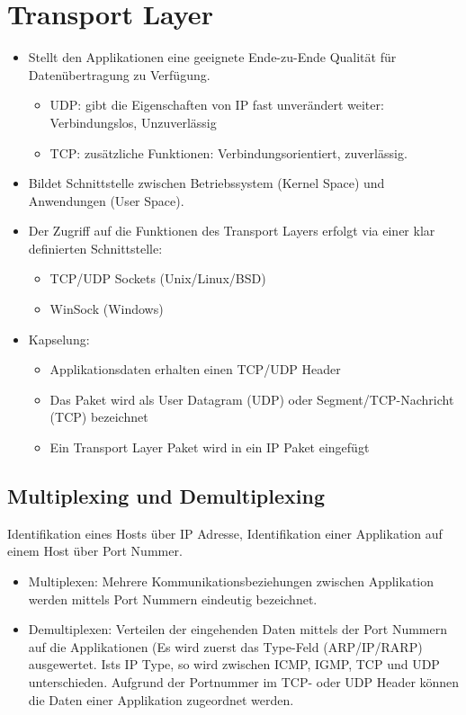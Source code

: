 \section*{Transport Layer}
\begin{itemize}
\item Stellt den Applikationen eine geeignete Ende-zu-Ende Qualität für
Datenübertragung zu Verfügung.

\begin{itemize}
\item UDP: gibt die Eigenschaften von IP fast unverändert weiter: Verbindungslos,
Unzuverlässig
\item TCP: zusätzliche Funktionen: Verbindungsorientiert, zuverlässig.
\end{itemize}
\item Bildet Schnittstelle zwischen Betriebssystem (Kernel Space) und Anwendungen
(User Space). 
\item Der Zugriff auf die Funktionen des Transport Layers erfolgt via einer
klar definierten Schnittstelle:

\begin{itemize}
\item TCP/UDP Sockets (Unix/Linux/BSD)
\item WinSock (Windows)
\end{itemize}
\item Kapselung: 

\begin{itemize}
\item Applikationsdaten erhalten einen TCP/UDP Header
\item Das Paket wird als User Datagram (UDP) oder Segment/TCP-Nachricht
(TCP) bezeichnet
\item Ein Transport Layer Paket wird in ein IP Paket eingefügt
\end{itemize}
\end{itemize}

\subsection*{Multiplexing und Demultiplexing}

Identifikation eines Hosts über IP Adresse, Identifikation einer Applikation
auf einem Host über Port Nummer.
\begin{itemize}
\item Multiplexen: Mehrere Kommunikationsbeziehungen zwischen Applikation
werden mittels Port Nummern eindeutig bezeichnet.
\item Demultiplexen: Verteilen der eingehenden Daten mittels der Port Nummern
auf die Applikationen (Es wird zuerst das Type-Feld (ARP/IP/RARP)
ausgewertet. Ists IP Type, so wird zwischen ICMP, IGMP, TCP und UDP
unterschieden. Aufgrund der Portnummer im TCP- oder UDP Header können
die Daten einer Applikation zugeordnet werden.
\end{itemize}

